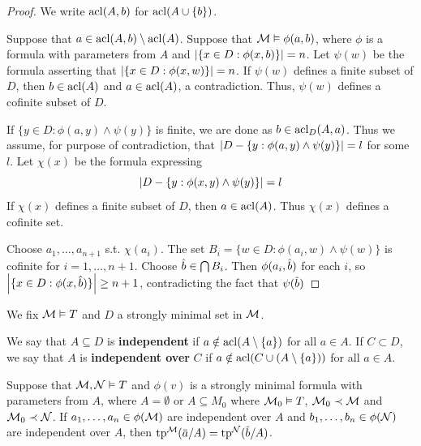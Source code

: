 \documentclass[11pt]{article}
\begin{document}
\begin{proof}
We write \(\operatorname{acl}(A,b)\) for \(\operatorname{acl}(A\cup\{b\})\).

Suppose that \(a\in\operatorname{acl}(A,b)\setminus\operatorname{acl}(A)\). Suppose that \(\mathcal{M}\vDash\phi(a,b)\), where \(\phi\) is a formula with
parameters from \(A\) and \(\abs{\{x\in D:\phi(x,b)\}}=n\). Let \(\psi(w)\) be the formula asserting
that \(\abs{\{x\in D:\phi(x,w)\}}=n\). If \(\psi(w)\) defines a finite subset of \(D\),
then \(b\in\operatorname{acl}(A)\) and \(a\in\operatorname{acl}(A)\), a contradiction. Thus, \(\psi(w)\) defines a cofinite subset
of \(D\).

If \(\{y\in D:\phi(a,y)\wedge\psi(y)\}\) is finite, we are done as \(b\in\operatorname{acl}_D(A,a)\). Thus we assume, for
purpose of contradiction, that \(\abs{D-\{y:\phi(a,y)\wedge\psi(y)\}}=l\) for some \(l\). Let \(\chi(x)\) be the
formula expressing
\begin{equation*}
\abs{D-\{y:\phi(x,y)\wedge\psi(y)\}}=l
\end{equation*}
If \(\chi(x)\) defines a finite subset of \(D\), then \(a\in\operatorname{acl}(A)\). Thus \(\chi(x)\) defines a
cofinite set.

Choose \(a_1,\dots,a_{n+1}\) s.t. \(\chi(a_i)\). The set \(B_i=\{w\in D:\phi(a_i,w)\wedge\psi(w)\}\) is cofinite
for \(i=1,\dots,n+1\). Choose \(\hat{b}\in\bigcap B_i\). Then \(\phi(a_i,\hat{b})\) for each \(i\),
so \(\abs{\{x\in D:\phi(x,\hatb)\}}\ge n+1\), contradicting the fact that \(\psi(\barb)\)
\end{proof}

We fix \(\mathcal{M}\vDash T\) and \(D\) a strongly minimal set in \(\mathcal{M}\).

\begin{definition}[]
We say that \(A\subseteq D\) is \textbf{independent} if \(a\notin\operatorname{acl}(A\setminus\{a\})\) for all \(a\in A\). If \(C\subset D\), we say
that \(A\) is \textbf{independent over} \(C\) if \(a\notin\operatorname{acl}(C\cup(A\setminus\{a\}))\) for all \(a\in A\).
\end{definition}

\begin{lemma}[]
\label{lemma6.1.6}
Suppose that \(\mathcal{M},\mathcal{N}\vDash T\) and \(\phi(v)\) is a strongly minimal formula with parameters from \(A\),
where \(A=\emptyset\) or \(A\subseteq M_0\) where \(\mathcal{M}_0\vDash T\), \(\mathcal{M}_0\prec\mathcal{M}\) and \(\mathcal{M}_0\prec\mathcal{N}\). If \(a_1,\dots,a_n\in\phi(\mathcal{M})\) are
independent over \(A\) and \(b_1,\dots,b_n\in\phi(\mathcal{N})\) are independent over \(A\),
then \(\tp^{\calm}(\bara/A)=\tp^{\caln}(\barb/A)\).
\end{lemma}
\end{document}
